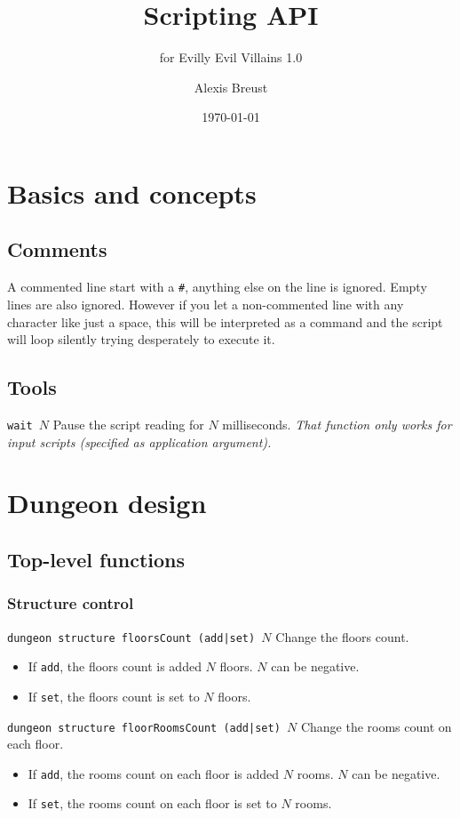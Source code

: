 \documentclass[10pt,a4paper]{scrartcl}
\title{Scripting API}
\subtitle{for Evilly Evil Villains 1.0}
\author{Alexis Breust}
\date{\today}
\newenvironment{apiCode}[1]
{ \begin{lrbox}{\mybox} \begin{minipage}{0.9\textwidth} {\color{Mahogany} \small\texttt{#1}} \vspace{8pt} \newline }
{ \end{minipage} \end{lrbox}\fbox{\usebox{\mybox}} \newline\vspace{4pt}\newline }
\begin{document}
\maketitle

\section{Basics and concepts}
\subsection{Comments}
A commented line start with a \texttt{\#}, anything else on the line is ignored. Empty lines are also ignored. However if you let a non-commented line with any character like just a space, this will be interpreted as a command and the script will loop silently trying desperately to execute it.

\subsection{Tools}
\begin{apiCode}{wait $N$}
Pause the script reading for $N$ milliseconds.\newline
\textit{That function only works for input scripts (specified as application argument).}
\end{apiCode}

\section{Dungeon design}
\subsection{Top-level functions}
\subsubsection{Structure control}
\begin{apiCode}{dungeon structure floorsCount (add|set) $N$}
Change the floors count.
\begin{itemize}
\itemsep 0em
\item If \verb#add#, the floors count is added $N$ floors. $N$ can be negative.
\item If \verb#set#, the floors count is set to $N$ floors.
\end{itemize}
\end{apiCode}
\begin{apiCode}{dungeon structure floorRoomsCount (add|set) $N$}
Change the rooms count on each floor.
\begin{itemize}
\itemsep 0em
\item If \verb#add#, the rooms count on each floor is added $N$ rooms. $N$ can be negative.
\item If \verb#set#, the rooms count on each floor is set to $N$ rooms.
\end{itemize}
\end{apiCode}
\end{document}
